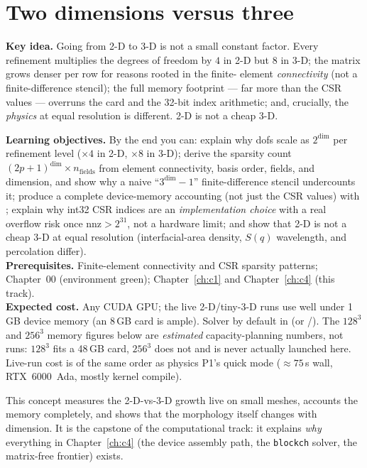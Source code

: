 \chapter{Two dimensions versus three}
\label{ch:c5}
\begin{keybox}
\textbf{Key idea.} Going from 2-D to 3-D is not a small constant factor.
Every refinement multiplies the degrees of freedom by $4$ in 2-D but $8$
in 3-D; the matrix grows denser per row for reasons rooted in the finite-
element \emph{connectivity} (not a finite-difference stencil); the full
memory footprint --- far more than the CSR values --- overruns the card
and the 32-bit index arithmetic; and, crucially, the \emph{physics} at
equal resolution is different. 2-D is not a cheap 3-D.
\end{keybox}

\begin{keybox}
\textbf{Learning objectives.} By the end you can: explain why dofs
scale as $2^{\dim}$ per refinement level ($\times4$ in 2-D, $\times8$ in
3-D); derive the sparsity count
$(2p+1)^{\dim}\times n_{\text{fields}}$ from element connectivity,
basis order, fields, and dimension, and show why a naive
``$3^{\dim}-1$'' finite-difference stencil undercounts it; produce a
complete device-memory accounting (not just the CSR values) with
; explain why int32 CSR indices are an
\emph{implementation choice} with a real overflow risk once
nnz$>2^{31}$, not a hardware limit; and show that 2-D is not a cheap
3-D at equal resolution (interfacial-area density, $S(q)$ wavelength,
and percolation differ).\\[2pt]
\textbf{Prerequisites.} Finite-element connectivity and CSR sparsity
patterns; Chapter~00 (environment green); Chapter~\ref{ch:c1} and
Chapter~\ref{ch:c4} (this track).\\[2pt]
\textbf{Expected cost.} Any CUDA GPU; the live 2-D/tiny-3-D runs use
well under 1\,GB device memory (an 8\,GB card is ample). Solver
 by default in  (or
/). The $128^3$ and $256^3$ memory figures below
are \emph{estimated} capacity-planning numbers, not runs: $128^3$ fits a
48\,GB card, $256^3$ does not and is never actually launched here.
Live-run cost is of the same order as physics P1's quick mode
($\approx75$\,s wall, RTX~6000~Ada, mostly kernel compile).
\end{keybox}

This concept measures the 2-D-vs-3-D growth live on small meshes,
accounts the memory completely, and shows that the morphology itself
changes with dimension. It is the capstone of the computational track:
it explains \emph{why} everything in Chapter~\ref{ch:c4} (the device
assembly path, the \texttt{blockch} solver, the matrix-free frontier)
exists.

